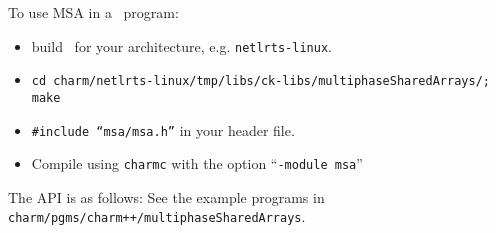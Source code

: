 To use MSA in a \charmpp\ program:
\begin{itemize}
\item build \charmpp\ for your architecture, e.g. \texttt{netlrts-linux}.
\item \texttt{cd charm/netlrts-linux/tmp/libs/ck-libs/multiphaseSharedArrays/; make}
\item \texttt{\#include ``msa/msa.h''} in your header file.
\item Compile using \texttt{charmc} with the option ``\texttt{-module
      msa}''
\end{itemize}

The API is as follows: See the example programs in
\texttt{charm/pgms/charm++/multiphaseSharedArrays}.
